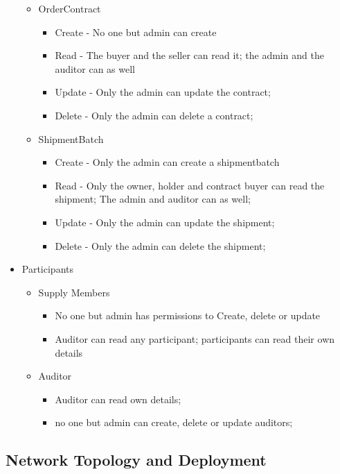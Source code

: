 \begin{itemize}
\begin{itemize}
\begin{itemize}
            \end{itemize}
        \item OrderContract
            \begin{itemize}
			\item Create - No one but admin can create
			\item Read - The buyer and the seller can read it; the admin and the auditor can as well
			\item Update - Only the admin can update the contract;
            \item Delete - Only the admin can delete a contract;
            \end{itemize}
        \item ShipmentBatch
            \begin{itemize}
			\item Create - Only the admin can create a shipmentbatch
			\item Read - Only the owner, holder and contract buyer can read the shipment; The admin and auditor can as well;
			\item Update - Only the admin can update the shipment;
            \item Delete - Only the admin can delete the shipment;
            \end{itemize}
        \end{itemize}
    \item Participants
        \begin{itemize}
        \item Supply Members
            \begin{itemize}
			\item No one but admin has permissions to Create, delete or update
            \item Auditor can read any participant; participants can read their own details
            \end{itemize}
        \item Auditor
            \begin{itemize}
			\item Auditor can read own details; 
            \item no one but admin can create, delete or update auditors;
            \end{itemize}
        \end{itemize}
\end{itemize}	


\subsection{Network Topology and Deployment}

